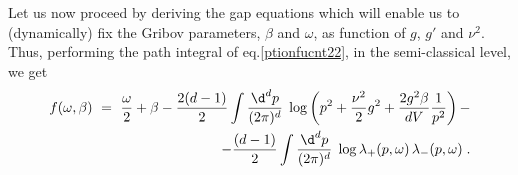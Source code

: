 Let us now proceed by deriving the gap equations which will enable us to (dynamically) fix the Gribov parameters, $\beta$ and $\omega$, as function of $g$, $g'$ and $\nu^2$. Thus, performing the path integral of eq.\eqref{ptionfucnt22}, in the semi-classical level, we get
\begin{eqnarray}
f(\omega, \beta) ~=~ \frac{\omega}{2} + \beta - \frac{2(d-1)}{2} \int \frac{\d^{d}p}{(2\pi)^{d}} \; \log \left(p^{2} + \frac{\nu^{2}}{2}g^{2} + \frac{2g^{2}\beta}{dV} \frac{1}{p^{2}}\right) -
\nonumber \\
- \frac{(d-1)}{2} \int \frac{\d^{d}p}{(2\pi)^{d}} \; \log \lambda_{+}(p, \omega)\, \lambda_{-}(p, \omega)\;. 
\label{f eq}
\end{eqnarray}
